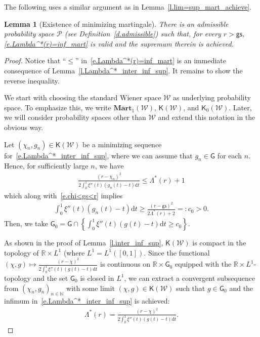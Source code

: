 \documentclass[11pt]{amsart}
\newtheorem{lemma}[proposition]{Lemma}
\theoremstyle{remark}
\theoremstyle{definition}
\numberwithin{equation}{section}
\numberwithin{proposition}{section}
\numberwithin{figure}{section}
\numberwithin{table}{section}
\newcommand{\N}{\mathbb{N}}
\newcommand{\R}{\mathbb{R}}
\renewcommand{\leq}{\leqslant}
\renewcommand{\geq}{\geqslant}
\newcommand{\Ll}{\left}
\newcommand{\Rr}{\right}
\renewcommand{\d}{\mathrm{d}}
\newcommand{\1}{\mathbf{1}}
\newcommand{\msf}{\mathsf}
\newcommand{\msc}{\mathscr}
\newcommand{\bmart}{\mathbf{Mart}}
\newcommand{\gs}{\msf {gs}}
\begin{document}
The following uses a similar argument as in Lemma~\ref{l.lim=sup_mart_achieve}.

\begin{lemma}[Existence of minimizing martingale]\label{l.Lambda^*=inf_mart_achieve}
There is an admissible probability space $\mathscr P$ (see Definition~\ref{d.admissible}) such that, for every $r>\gs$,
\eqref{e.Lambda^*(r)=inf_mart} is valid and the supremum therein is achieved.
\end{lemma}

\begin{proof}
Notice that ``$\leq$'' in~\eqref{e.Lambda^*(r)=inf_mart} is an immediate consequence of Lemma~\ref{l.Lambda^*_inter_inf_sup}. It remains to show the reverse inequality.

We start with choosing the standard Wiener space $\msc W$ as underlying probability space. To emphasize this, we write $\bmart_1(\msc W)$, $\msf K(\msc W)$, and $\msf K_0(\msc W)$.
Later, we will consider probability spaces other than $\msc W$ and extend this notation in the obvious way.

Let $(\chi_n,g_n)\in\msf K(\msc W)$ be a minimizing sequence for~\eqref{e.Lambda^*_inter_inf_sup}, where we can assume that $g_n\in\msf G$ for each $n$. 
Hence, for sufficiently large $n$, we have
\begin{align*}
    \frac{(r-\chi_n)^2}{2\int_0^1\xi''(t)(g_n(t)-t)\d t} \leq \Lambda^*(r)+1
\end{align*}
which along with~\eqref{e.chi<gs<r} implies
\begin{align*}
    \int_0^1\xi''(t)(g_n(t)-t)\d t \geq \frac{(r-\gs)^2}{2\Lambda^*(r)+2}=:c_0>0.
\end{align*}
Then, we take $\msf G_0=\msf G\cap\Ll\{\int_0^1\xi''(t)(g(t)-t)\d t\geq c_0\Rr\}$.

As shown in the proof of Lemma~\ref{l.inter_inf_sup}, $\msf K(\msc W)$ is compact in the topology of $\R\times L^1$ (where $L^1=L^1([0,1])$. Since the functional $(\chi,g)\mapsto \frac{(r-\chi)^2}{2\int_0^1\xi''(t)(g(t)-t)\d t}$ is continuous on $\R\times \msf G_0$ equipped with the $\R\times L^1$-topology and the set $\msf G_0$ is closed in $L^1$, we can extract a convergent subsequence from $(\chi_n,g_n)_{n\in\N}$ with some limit $(\chi,g)\in \msf K(\msc W)$ such that $g\in \msf G_0$ and the infimum in~\eqref{e.Lambda^*_inter_inf_sup} is achieved:
\begin{align}\label{e.Lambda^*(r)=..chi..g}
    \Lambda^*(r) = \frac{(r-\chi)^2}{2\int_0^1\xi''(t)(g(t)-t)\d t}.
\end{align}


\end{proof}
\end{document}

